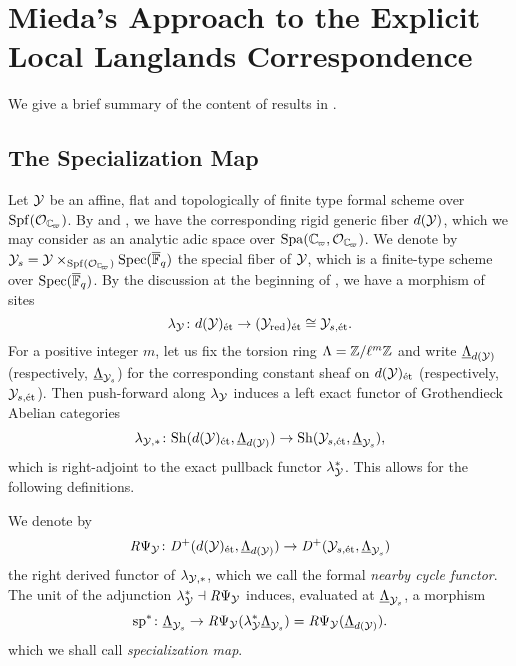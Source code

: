 \documentclass[../main.tex]{subfiles}
\begin{document}
\section{Mieda's Approach to the Explicit Local Langlands Correspondence} %
\label{sec:Mieda's Approach to the Explicit Local Langlands Correspondence}

We give a brief summary of the content of results in \cite{mieda2016geometric}.

\subsection{The Specialization Map} %
\label{sub:The Injectivity FinLevel}
Let $\mathcal{Y}$ be an affine, flat and topologically of finite type formal scheme over $\Spf(\cO_\Cp)$.
By \cite{raynaud1974geometrie} and \cite[§1.9]{huber2013etale},
we
have the corresponding rigid generic fiber $d(\mathcal{Y})$, which we may
consider as an analytic adic space over $\Spa(\Cp,\cO_\Cp)$. We denote by $\cY_s = \cY \times_{\Spf(\cO_\Cp)} \spec
(\Fqbar)$ the special fiber of $\mathcal{Y}$, which is a finite-type scheme over $\operatorname{Spec}(
{\overline {\mathbb{F}}_q})$. By the discussion at the beginning of \cite[§3.5]{huber2013etale}, we have a morphism of sites
\begin{equation*}
  \lambda_{\mathcal{Y}} \colon d(\mathcal{Y})_{\textnormal{\'et}} \to (\mathcal{Y}_{\mathrm{red}})_{\textnormal{\'et}} \cong \mathcal{Y}_{s, \textnormal{\'et}}.
\end{equation*}
For a positive integer $m$, let us fix the torsion ring $\Lambda = \mathbb{Z}/\ell^m
\mathbb{Z}$ and write $\underline \Lambda_{d(\mathcal{Y})}$ (respectively, $\underline
\Lambda_{\mathcal{Y}_{s}}$)
for the corresponding constant sheaf on $d(\mathcal{Y})_{\textnormal{\'et}}$ (respectively, $\mathcal{Y}_{s,\textnormal{\'et}}$). Then 
push-forward along $\lambda_{\mathcal{Y}}$ induces a left exact functor of Grothendieck
Abelian categories
\begin{equation*}
  \lambda_{\mathcal{Y},*}\colon \mathrm{Sh}(d(\mathcal{Y})_{\textnormal{\'et}}, {\underline \Lambda_{d(\mathcal{Y})}}) \to
  \mathrm{Sh}(\mathcal{Y}_{s,\textnormal{\'et}}, {\underline \Lambda_{\mathcal{Y}_{s}}}),
\end{equation*}
which is right-adjoint to the exact pullback functor $\lambda_{\mathcal{Y}}^*$.
This allows for the following definitions.

\begin{defi}\label{def:FormalNearbyCycleFunctor}
  We denote by
  \begin{equation*}
    \mathit R \Psi_{\mathcal{Y}}\colon \mathit D^+ (d(\mathcal{Y})_{\textnormal{\'et}}, {\underline \Lambda_{d(\mathcal{Y})}}) \to
    \mathit D ^+ (\mathcal{Y}_{s, \textnormal{\'et}},{\underline \Lambda_{\mathcal{Y}_{s}}})
  \end{equation*}
  the right derived functor of $\lambda_{\mathcal{Y},*}$, which we call the formal \emph{nearby
  cycle functor}. The unit of the adjunction $\lambda_{\mathcal{Y}}^* \dashv 
  \mathit R \Psi_{\mathcal{Y}}$ induces, evaluated at $\underline \Lambda_{\mathcal{Y}_{s}}$, a morphism
  \begin{equation*}
    \mathrm{sp}^* \colon \underline \Lambda_{\mathcal{Y}_{s}} \to 
    \mathit R \Psi_{\mathcal{Y}}( \lambda_{\mathcal{Y}}^* \underline \Lambda_{\mathcal{Y}_{s}}) = 
    \mathit R \Psi_{\mathcal{Y}}(\underline \Lambda_{d(\mathcal{Y})}).
  \end{equation*}
  which we shall call \emph{specialization map}.
\end{defi}
\end{document}
